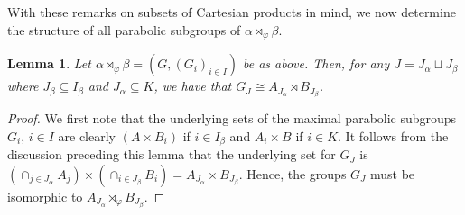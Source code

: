 \documentclass[11pt,letterpaper]{amsart}
\newtheorem{lemma}[prop]{Lemma}
\begin{document}
With these remarks on subsets of Cartesian products in mind, we now determine the structure of all parabolic subgroups of $\alpha \rtimes_\varphi \beta$.

\begin{lemma}\label{lem:parabolicsNatural}
    Let $\alpha \rtimes_\varphi \beta = (G, (G_i)_{i \in I})$ be as above. Then, for any $J = J_\alpha \sqcup J_\beta$ where $J_\beta \subseteq I_\beta$ and $J_\alpha \subseteq K$, we have that $G_J \cong A_{J_\alpha} \rtimes B_{J_\beta}$.
\end{lemma}
\begin{proof}
We first note that the underlying sets of the maximal parabolic subgroups $G_i$, $i \in I$ are clearly $(A \times B_i)$ if $i\in I_\beta$ and $A_i \times B$ if $i \in K$. It follows from the discussion preceding this lemma that the underlying set for $G_J$ is $(\cap_{j\in J_\alpha} A_{j}) \times (\cap_{i \in J_\beta} B_i) = A_{J_\alpha} \times B_{J_\beta}$. Hence, the groups $G_J$ must be isomorphic to $A_{J_\alpha} \rtimes_\varphi B_{J_\beta}$. 
\end{proof}
\end{document}
